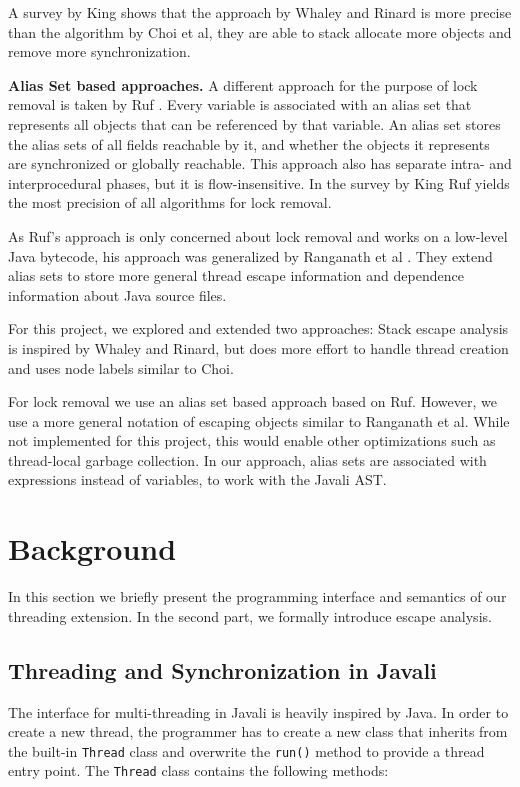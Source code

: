 \documentclass[letterpaper]{article}
\newcommand{\mypar}[1]{{\bf #1.}}
\begin{document}
A survey by King \cite{King:04} shows that the approach by Whaley and Rinard is more precise
than the algorithm by Choi et al, they are able to stack allocate more objects and
remove more synchronization.

\mypar{Alias Set based approaches}
A different approach for the purpose of lock removal is taken by Ruf \cite{Ruf:00}.
Every variable is associated with an alias set that represents all objects that
can be referenced by that variable. An alias set stores the alias sets of all
fields reachable by it, and whether the objects it represents are synchronized
or globally reachable. This approach also has separate intra- and interprocedural
phases, but it is flow-insensitive. In the survey by  King \cite{King:04} Ruf
yields the most precision of all algorithms for lock removal.

As Ruf's approach is only concerned about lock removal and works on a low-level
Java bytecode, his approach was generalized by Ranganath et al \cite{Ranganath:04}.
They extend alias sets to store more general thread escape information
and dependence information about Java source files.

For this project, we explored and extended two approaches: Stack escape analysis
is inspired by Whaley and Rinard, but does more effort to handle thread creation
and uses node labels similar to Choi.

For lock removal we use an alias set based approach based on Ruf. However, we
use a more general notation of escaping objects similar to Ranganath et al. While
not implemented for this project, this would enable other optimizations such
as thread-local garbage collection. In our approach, alias sets are associated
with expressions instead of variables, to work with the Javali AST.


\section{Background}\label{sec:background}

In this section we briefly present the programming interface and semantics of our
threading extension. In the second part, we formally introduce escape analysis.

\subsection{Threading and Synchronization in Javali}
The interface for multi-threading in Javali is heavily inspired by Java. In
order to create a new thread, the programmer has to create a new class that
inherits from the built-in \texttt{Thread} class and overwrite the \texttt{run()}
method to provide a thread entry point. 
The \texttt{Thread} class contains the following methods:
\end{document}
